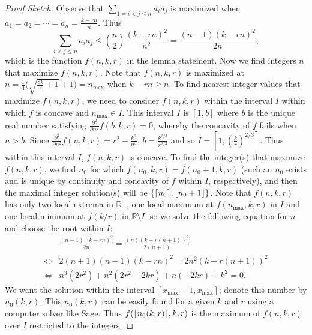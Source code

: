 \documentclass[12]{article}
\newcommand{\R}{\mathbb{R}}
\DeclarePairedDelimiter\ceil{\lceil}{\rceil}
\DeclarePairedDelimiter\floor{\lfloor}{\rfloor}
\theoremstyle{definition}
\begin{document}
	\begin{proof}[Proof Sketch]
		Observe that $\sum_{1=i<j \leq n}a_ia_j$ is maximized when $a_1 = a_2 = \cdots = a_n = \frac{k-rn}{n}$.  Thus 
		$$\sum_{i<j \leq n} a_ia_j \leq {n \choose 2}\frac{(k-rn)^2}{n^2} = \frac{(n-1)(k-rn)^2}{2n},$$
		which is the function $f(n,k,r)$ in the lemma statement.  Now we find integers $n$ that maximize $f(n,k,r)$.  Note that $f(n,k,r)$ is maximized at $n = \frac{1}{4}\big( \sqrt{\frac{8k}{r} + 1} + 1 \big) = n_{\max}$ when $k-rn \geq n$.  To find nearest integer values that maximize $f(n,k,r)$, we need to consider $f(n,k,r)$ within the interval $I$ within which $f$ is concave and $n_{\max} \in I$.   This interval $I$ is $[1,b]$ where $b$ is the unique real number satisfying $\frac{\partial^2}{\partial n^2}f(b,k,r) = 0$, whereby the concavity of $f$ fails when $n > b$.  Since $\frac{\partial^2}{\partial n^2}f(n,k,r) = r^2 - \frac{k^2}{n^3}$, $b = \frac{k^{2/3}}{r^{2/3}}$ and so $I = [1,(\tfrac{k}{r})^{2/3}]$.  Thus within this interval $I$, $f(n,k,r)$ is concave.  To find the integer(s) that maximize $f(n,k,r)$, we find $n_0$ for which $f(n_0,k,r) = f(n_0+1,k,r)$ (such an $n_0$ exists and is unique by continuity and concavity of $f$ within $I$, respectively), and then the maximal integer solution(s) will be $\{\ceil{n_0}, \floor{n_0+1}\}$.  Note that $f(n,k,r)$ has only two local extrema in $\R^+$, one local maximum at $f(n_{\max},k,r)$ in $I$ and one local minimum at $f(k/r)$ in $\R \setminus I$, so we solve the following equation for $n$ and choose the root within $I$:
		\begin{align*}
			& \frac{(n-1)(k-rn)^2}{2n} = \frac{(n)(k-r(n+1))^2}{2(n+1)}	\\
			\Leftrightarrow& 2(n+1)(n-1)(k-rn)^2 = 2n^2(k-r(n+1))^2	\\
			\Leftrightarrow& n^3(2r^2) + n^2(2r^2-2kr) + n(-2kr) + k^2 = 0.
		\end{align*}
	We want the solution within the interval $[x_{\max}-1,x_{\max}]$; denote this number by $n_0(k,r)$.  This $n_0(k,r)$ can be easily found for a given $k$ and $r$ using a computer solver like Sage.  Thus $f(\ceil{n_0(k,r)}, k, r)$ is the maximum of $f(n,k,r)$ over $I$ restricted to the integers. 
	

\end{proof}
\end{document}
